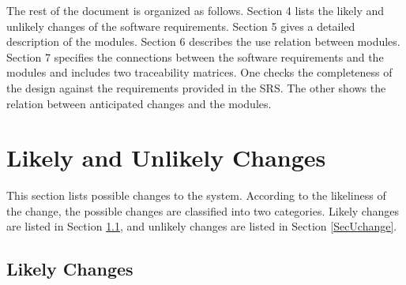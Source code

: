 \documentclass[12pt, titlepage]{article}
\begin{document}
The rest of the document is organized as follows. Section 4 lists the likely and unlikely changes of the software requirements. Section 5 gives a detailed description of the
modules. Section 6 describes the use relation between modules. Section 7 specifies the connections between the software requirements and the modules and includes two traceability matrices. One checks
the completeness of the design against the requirements provided in the SRS. The
other shows the relation between anticipated changes and the modules. 

\section{Likely and Unlikely Changes} \label{SecChange}

This section lists possible changes to the system. According to the likeliness
of the change, the possible changes are classified into two
categories. Likely changes are listed in Section \ref{SecLchange}, and
unlikely changes are listed in Section \ref{SecUchange}.

\subsection{Likely Changes} \label{SecLchange}
\end{document}

